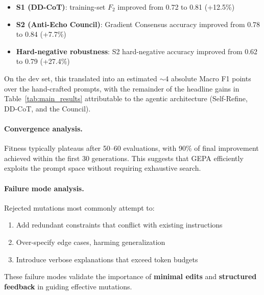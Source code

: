 \documentclass[11pt]{article}
\begin{document}
\begin{itemize}[noitemsep]
	\item \textbf{S1 (DD-CoT)}: training-set $F_2$ improved from 0.72 to 0.81 (+12.5\%)
	\item \textbf{S2 (Anti-Echo Council)}: Gradient Consensus accuracy improved from 0.78 to 0.84 (+7.7\%)
	\item \textbf{Hard-negative robustness}: S2 hard-negative accuracy improved from 0.62 to 0.79 (+27.4\%)
\end{itemize}
On the dev set, this translated into an estimated $\sim$4 absolute Macro F1
points over the hand-crafted prompts, with the remainder of the headline
gains in Table~\ref{tab:main_results} attributable to the agentic
architecture (Self-Refine, DD-CoT, and the Council).

\paragraph{Convergence analysis.} Fitness typically plateaus after 50--60 evaluations, with 90\% of final
improvement achieved within the first 30 generations. This suggests that GEPA
efficiently exploits the prompt space without requiring exhaustive search.

\paragraph{Failure mode analysis.} Rejected mutations most commonly attempt to:
\begin{enumerate}[noitemsep]
	\item Add redundant constraints that conflict with existing instructions
	\item Over-specify edge cases, harming generalization
	\item Introduce verbose explanations that exceed token budgets
\end{enumerate}

These failure modes validate the importance of \textbf{minimal edits} and
\textbf{structured feedback} in guiding effective mutations.
\end{document}
